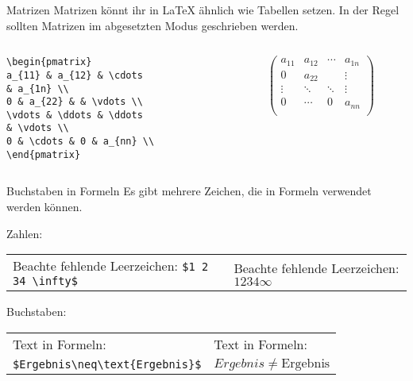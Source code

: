 \begin{frame}[fragile]{Matrizen}
Matrizen könnt ihr in \LaTeX{} ähnlich wie Tabellen setzen. In der Regel sollten Matrizen im abgesetzten Modus geschrieben werden. 
\begin{columns}
\begin{column}{0.55\textwidth}
\begin{codeblock}
\begin{verbatim}
\begin{pmatrix}
a_{11} & a_{12} & \cdots 
& a_{1n} \\
0 & a_{22} & & \vdots \\
\vdots & \ddots & \ddots 
& \vdots \\
0 & \cdots & 0 & a_{nn} \\
\end{pmatrix}
\end{verbatim}
\end{codeblock}
\end{column}
\begin{column}{0.35\textwidth}
\[
\begin{pmatrix}
a_{11} & a_{12} & \cdots & a_{1n} \\
0 & a_{22} & & \vdots \\
\vdots & \ddots & \ddots & \vdots \\
0 & \cdots & 0 & a_{nn} \\
\end{pmatrix}
\]
\end{column}
\end{columns}\pause
\end{frame}

\begin{frame}[fragile]{Buchstaben in Formeln}
Es gibt mehrere Zeichen, die in Formeln verwendet werden können. 

Zahlen: 
\begin{center}
\begin{tabular}{p{}p{}}
Beachte fehlende Leerzeichen: \verb+$1 2 34 \infty$+ & Beachte fehlende Leerzeichen: $1 2 34 \infty$
\end{tabular}
\end{center}
Buchstaben:
\begin{center}
\begin{tabular}{p{}p{}}
Text in Formeln:   & Text in Formeln:  \\
\verb+$Ergebnis\neq\text{Ergebnis}$+ & $Ergebnis\neq\text{Ergebnis}$
\end{tabular}
\end{center}
\end{frame}

